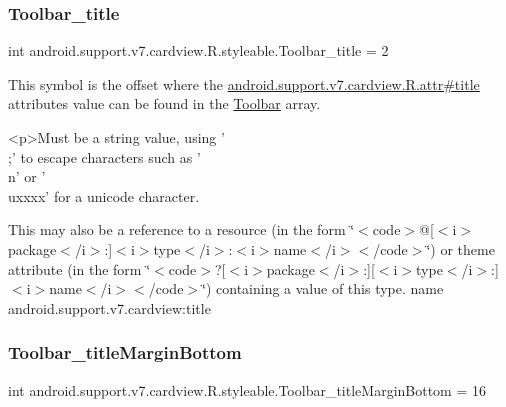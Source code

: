 \subsubsection{\texorpdfstring{Toolbar\+\_\+title}{Toolbar\_title}}
{\footnotesize\ttfamily int android.\+support.\+v7.\+cardview.\+R.\+styleable.\+Toolbar\+\_\+title = 2\hspace{0.3cm}{\ttfamily [static]}}

This symbol is the offset where the \hyperlink{classandroid_1_1support_1_1v7_1_1cardview_1_1R_1_1attr_a152f347649775e5aee3805c09dbbab39}{android.\+support.\+v7.\+cardview.\+R.\+attr\#title} attribute\textquotesingle{}s value can be found in the \hyperlink{classandroid_1_1support_1_1v7_1_1cardview_1_1R_1_1styleable_a26149aeb8fd339abe09ecc9d92b9304f}{Toolbar} array.

\begin{DoxyVerb}      <p>Must be a string value, using '\\;' to escape characters such as '\\n' or '\\uxxxx' for a unicode character.
\end{DoxyVerb}
 

This may also be a reference to a resource (in the form \char`\"{}$<$code$>$@\mbox{[}$<$i$>$package$<$/i$>$\+:\mbox{]}$<$i$>$type$<$/i$>$\+:$<$i$>$name$<$/i$>$$<$/code$>$\char`\"{}) or theme attribute (in the form \char`\"{}$<$code$>$?\mbox{[}$<$i$>$package$<$/i$>$\+:\mbox{]}\mbox{[}$<$i$>$type$<$/i$>$\+:\mbox{]}$<$i$>$name$<$/i$>$$<$/code$>$\char`\"{}) containing a value of this type.  name android.\+support.\+v7.\+cardview\+:title \mbox{\label{classandroid_1_1support_1_1v7_1_1cardview_1_1R_1_1styleable_ad223c3ae470aaccab0964ae1eab151d8}} 
\subsubsection{\texorpdfstring{Toolbar\+\_\+title\+Margin\+Bottom}{Toolbar\_titleMarginBottom}}
{\footnotesize\ttfamily int android.\+support.\+v7.\+cardview.\+R.\+styleable.\+Toolbar\+\_\+title\+Margin\+Bottom = 16\hspace{0.3cm}{\ttfamily [static]}}

